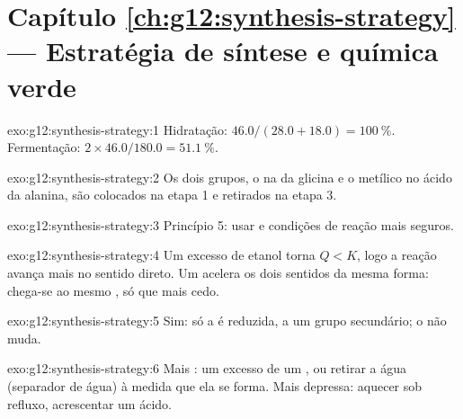 \section*{Capítulo \ref{ch:g12:synthesis-strategy} --- Estratégia de síntese e química verde}

\begin{solution}{exo:g12:synthesis-strategy:1}
Hidratação: $46.0/(28.0 + 18.0) = \qty{100}{\percent}$. Fermentação:
$2 \times 46.0/180.0 = \qty{51.1}{\percent}$.
\end{solution}

\begin{solution}{exo:g12:synthesis-strategy:2}
Os dois grupos, o  na  da glicina e o  metílico no ácido
da alanina, são colocados na etapa 1 e retirados na etapa 3.
\end{solution}

\begin{solution}{exo:g12:synthesis-strategy:3}
Princípio 5: usar  e condições de reação mais seguros.
\end{solution}

\begin{solution}{exo:g12:synthesis-strategy:4}
Um excesso de etanol torna $Q < K$, logo a reação avança mais no
sentido direto. Um  acelera os dois sentidos da mesma forma:
chega-se ao mesmo , só que mais cedo.
\end{solution}

\begin{solution}{exo:g12:synthesis-strategy:5}
Sim: só a  é reduzida, a um grupo  secundário; o  não
muda.
\end{solution}

\begin{solution}{exo:g12:synthesis-strategy:6}
Mais : um excesso de um , ou retirar a água (separador de
água) à medida que ela se forma. Mais depressa: aquecer sob refluxo,
acrescentar um  ácido.
\end{solution}

